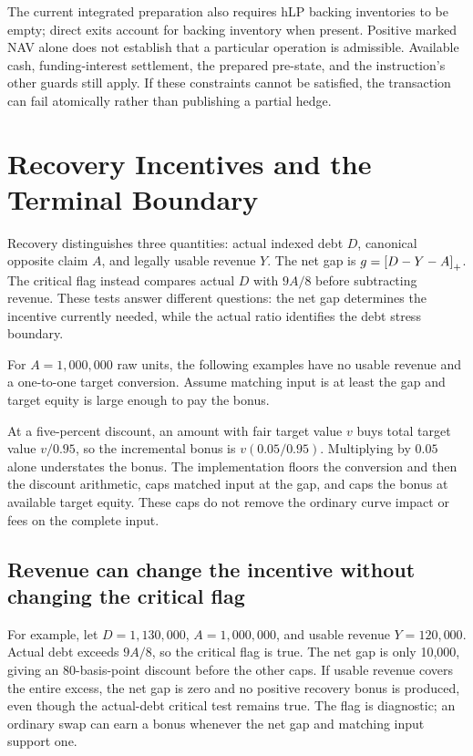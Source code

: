 The current integrated preparation also requires hLP backing inventories to be empty; direct exits account for backing inventory when present. Positive marked NAV alone does not establish that a particular operation is admissible. Available cash, funding-interest settlement, the prepared pre-state, and the instruction's other guards still apply. If these constraints cannot be satisfied, the transaction can fail atomically rather than publishing a partial hedge.

\section{Recovery Incentives and the Terminal Boundary}
\label{app:recovery}

Recovery distinguishes three quantities: actual indexed debt $D$, canonical opposite claim $A$, and legally usable revenue $Y$. The net gap is $g=\left[D-Y-A\right]_+$. The critical flag instead compares actual $D$ with $9A/8$ before subtracting revenue. These tests answer different questions: the net gap determines the incentive currently needed, while the actual ratio identifies the debt stress boundary.

For $A=1{,}000{,}000$ raw units, the following examples have no usable revenue and a one-to-one target conversion. Assume matching input is at least the gap and target equity is large enough to pay the bonus.


At a five-percent discount, an amount with fair target value $v$ buys total target value $v/0.95$, so the incremental bonus is $v(0.05/0.95)$. Multiplying by $0.05$ alone understates the bonus. The implementation floors the conversion and then the discount arithmetic, caps matched input at the gap, and caps the bonus at available target equity. These caps do not remove the ordinary curve impact or fees on the complete input.

\subsection{Revenue can change the incentive without changing the critical flag}

For example, let $D=1{,}130{,}000$, $A=1{,}000{,}000$, and usable revenue $Y=120{,}000$. Actual debt exceeds $9A/8$, so the critical flag is true. The net gap is only 10,000, giving an 80-basis-point discount before the other caps. If usable revenue covers the entire excess, the net gap is zero and no positive recovery bonus is produced, even though the actual-debt critical test remains true. The flag is diagnostic; an ordinary swap can earn a bonus whenever the net gap and matching input support one.

